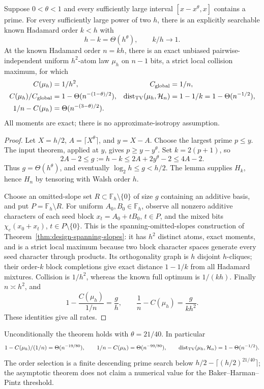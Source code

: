 \begin{theorem}
\label{thm:stability-prime-transfer}
Suppose $0<\theta<1$ and every sufficiently large interval
$[x-x^\theta,x]$ contains a prime. For every sufficiently large power
of two $h$, there is an explicitly searchable known Hadamard order
$k<h$ with
\[
 h-k=\Theta(h^\theta),\qquad k/h\to1.
\]
At the known Hadamard order $n=kh$, there is an exact unbiased
pairwise-independent uniform $h^2$-atom law $\mu_h$ on $n-1$ bits,
a strict local collision maximum, for which
\begin{align*}
 C(\mu_h)&=1/h^2, & C_{\rm global}&=1/n,\\
 C(\mu_h)/C_{\rm global}&=1-\Theta(n^{-(1-\theta)/2}),&
 \operatorname{dist}_{\rm TV}(\mu_h,\mathcal H_n)
 &=1-1/k=1-\Theta(n^{-1/2}),\\
 1/n-C(\mu_h)&=\Theta(n^{-(3-\theta)/2}).
\end{align*}
All moments are exact; there is no approximate-isotropy assumption.
\end{theorem}
\begin{proof}
Let $X=h/2$, $A=\lceil X^\theta\rceil$, and $y=X-A$.
Choose the largest prime $p\le y$. The input theorem, applied at $y$,
gives $p\ge y-y^\theta$. Set $k=2(p+1)$, so
\[
 2A-2\le g:=h-k\le2A+2y^\theta-2\le4A-2.
\]
Thus $g=\Theta(h^\theta)$, and eventually
$\log_2h\le g<h/2$. The lemma supplies $H_k$, hence $H_n$ by tensoring
with Walsh order $h$.

Choose an omitted-slope set $R\subset\mathbb F_h\setminus\{0\}$ of
size $g$ containing an additive basis, and put
$P=\mathbb F_h\setminus R$. For uniform $A_0,B_0\in\mathbb F_h$, observe
all nonzero additive characters of each seed block
$x_t=A_0+tB_0$, $t\in P$, and the mixed bits $\chi_e(x_0+x_t)$,
$t\in P\setminus\{0\}$. This is the spanning-omitted-slopes construction
of Theorem~\ref{thm:design-spanning-slopes}: it has $h^2$ distinct atoms,
exact moments, and is a strict local maximum because two block character
spaces generate every seed character through products. Its orthogonality
graph is $h$ disjoint $h$-cliques; their order-$k$ block completions give
exact distance $1-1/k$ from all Hadamard mixtures. Collision is $1/h^2$,
whereas the known full optimum is $1/(kh)$.
Finally $n\asymp h^2$, and
\[
 1-\frac{C(\mu_h)}{1/n}=\frac gh,\qquad
 \frac1n-C(\mu_h)=\frac{g}{kh^2}.
\]
These identities give all rates.
\end{proof}

\begin{corollary}
\label{cor:stability-bhp-rate}
Unconditionally the theorem holds with $\theta=21/40$. In particular
\[
 1-C(\mu_h)/(1/n)=\Theta(n^{-19/80}),\qquad
 1/n-C(\mu_h)=\Theta(n^{-99/80}),\qquad
 \operatorname{dist}_{\rm TV}(\mu_h,\mathcal H_n)=1-\Theta(n^{-1/2}).
\]
The order selection is a finite descending prime search below
$h/2-\lceil(h/2)^{21/40}\rceil$; the asymptotic theorem does not claim
a numerical value for the Baker--Harman--Pintz threshold.
\end{corollary}

